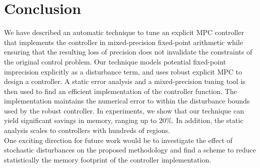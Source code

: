 \section{Conclusion}

We have described an automatic technique to tune an explicit MPC
controller that implements the controller in mixed-precision fixed-point arithmetic
while ensuring that the resulting loss of precision does not invalidate the
constraints of the original control problem.
Our technique models potential fixed-point imprecision explicitly as a disturbance
term, and uses robust explicit MPC to design a controller.
A static error analysis and a mixed-precision tuning tool is then 
used to find an efficient implementation of the controller function.
The implementation maintains the numerical error to within
the disturbance bounds used by the robust controller.
In experiments, we show that our technique can yield significant savings in memory,
ranging up to 20\%. 
In addition, the static analysis scales to controllers with hundreds of regions.\\
One exciting direction for future work would be to investigate the effect of stochastic disturbances on the proposed methodology and find a scheme to reduce statistically the memory footprint of the controller implementation.


